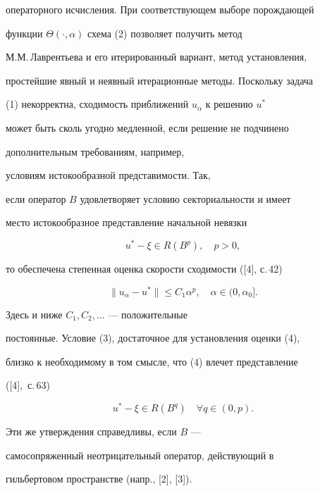 операторного исчисления. При соответствующем выборе порождающей


функции $\Theta(\cdot, \alpha)$ схема (2) позволяет получить метод


М.М.\,Лаврентьева и его итерированный вариант, метод установления,


простейшие явный и неявный итерационные методы. Поскольку задача


(1) некорректна, сходимость приближений $u_\alpha$ к решению $u^*$


может быть сколь угодно медленной, если решение не подчинено


дополнительным требованиям, например,


условиям истокообразной представимости. Так,


если оператор $B$ удовлетворяет условию секториальности и имеет


место истокообразное представление начальной невязки


\begin{equation}


u^* - \xi \in R(B^p), \quad p>0,


\end{equation}


то обеспечена степенная оценка скорости сходимости ([4], с.\,42) 


\begin{equation}


\| u_\alpha - u^*\| \leq C_1{\alpha}^p,\quad \alpha\in(0,


\alpha_0].


\end{equation}


Здесь и ниже $C_1, C_2,\dotsc$ --- положительные


постоянные. Условие (3), достаточное для установления оценки (4),


близко к необходимому в том смысле, что (4) влечет представление


([4],~с.\,63) 


\begin{equation*}


u^* - \xi \in R(B^q) \quad\forall q\in(0,p).


\end{equation*}


Эти же утверждения справедливы, если $B$ ---


самосопряженный неотрицательный оператор, действующий в


гильбертовом пространстве (напр., [2], [3]).



